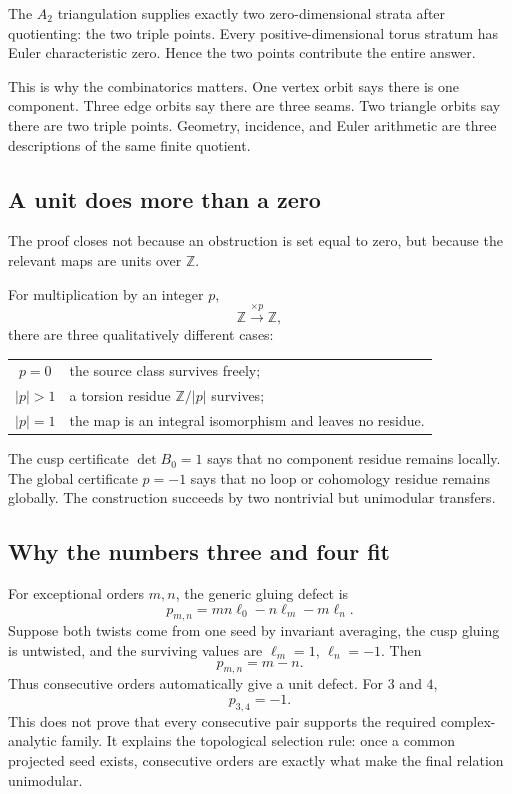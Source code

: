 \documentclass[11pt,reqno]{amsart}
\numberwithin{equation}{section}
\newcommand{\Z}{\mathbb Z}
\theoremstyle{definition}
\begin{document}
The $A_2$ triangulation supplies exactly two zero-dimensional strata after quotienting: the two triple points. Every positive-dimensional torus stratum has Euler characteristic zero. Hence the two points contribute the entire answer.

This is why the combinatorics matters. One vertex orbit says there is one component. Three edge orbits say there are three seams. Two triangle orbits say there are two triple points. Geometry, incidence, and Euler arithmetic are three descriptions of the same finite quotient.

\subsection{A unit does more than a zero}

The proof closes not because an obstruction is set equal to zero, but because the relevant maps are units over $\Z$.

For multiplication by an integer $p$,
\[
\Z\xrightarrow{\times p}\Z,
\]
there are three qualitatively different cases:
\begin{center}
\begin{tabular}{@{}cl@{}}
\toprule
$p=0$ & the source class survives freely;\\
$|p|>1$ & a torsion residue $\Z/|p|$ survives;\\
$|p|=1$ & the map is an integral isomorphism and leaves no residue.\\
\bottomrule
\end{tabular}
\end{center}
The cusp certificate $\det B_0=1$ says that no component residue remains locally. The global certificate $p=-1$ says that no loop or cohomology residue remains globally. The construction succeeds by two nontrivial but unimodular transfers.

\subsection{Why the numbers three and four fit}

For exceptional orders $m,n$, the generic gluing defect is
\[
p_{m,n}=mn\ell_0-n\ell_m-m\ell_n.
\]
Suppose both twists come from one seed by invariant averaging, the cusp gluing is untwisted, and the surviving values are $\ell_m=1$, $\ell_n=-1$. Then
\[
p_{m,n}=m-n.
\]
Thus consecutive orders automatically give a unit defect. For $3$ and $4$,
\[
p_{3,4}=-1.
\]
This does not prove that every consecutive pair supports the required complex-analytic family. It explains the topological selection rule: once a common projected seed exists, consecutive orders are exactly what make the final relation unimodular.
\end{document}
